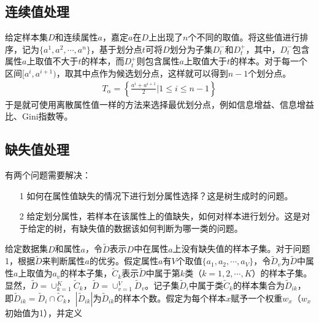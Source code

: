 \subsection{连续值处理}
给定样本集$D$和连续属性$a$，嘉定$a$在$D$上出现了$n$个不同的取值。将这些值进行排序，记为$\{ a^1,a^2,\cdots,a^n \}$，基于划分点$t$可将$D$划分为子集$D_t^-$和$D_t^+$，其中，$D_t^-$包含属性$a$上取值不大于$t$的样本，而$D_t^+$则包含属性$a$上取值大于$t$的样本。对于每一个区间$[ a^i,a^{i+1} )$，取其中点作为候选划分点，这样就可以得到$n-1$个划分点。
\begin{eqnarray}
T_\alpha=
\left\lbrace
\frac{a^i+a^{i+1}}{2}|1\leq i\leq n-1
\right\rbrace
\end{eqnarray}
于是就可使用离散属性值一样的方法来选择最优划分点，例如信息增益、信息增益比、Gini指数等。

\subsection{缺失值处理}
有两个问题需要解决：
\begin{itemize}
\item[1] 如何在属性值缺失的情况下进行划分属性选择？这是树生成时的问题。
\item[2] 给定划分属性，若样本在该属性上的值缺失，如何对样本进行划分。这是对于给定的树，有缺失值的数据该如何判断为哪一类的问题。
\end{itemize}
给定数据集$D$和属性$a$，令$\tilde{D}$表示$D$中在属性$a$上没有缺失值的样本子集。对于问题1，根据$\tilde{D}$来判断属性$a$的优劣。假定属性$a$有$V$个取值$\{ a_1,a_2,\cdots,a_V \}$，令$\tilde{D}_v$为$\tilde{D}$中属性$a$上取值为$a_v$的样本子集，$\tilde{C}_k$表示$\tilde{D}$中属于第$k$类（$k=1,2,\cdots,K$）的样本子集。显然，$\tilde{D}=\cup^{K}_{k=1}\tilde{C}_k$，$\tilde{D}=\cup^{V}_{v=1}\tilde{D}_v$。记子集$\tilde{D}_i$中属于类$\tilde{C}_k$的样本集合为$\tilde{D}_{ik}$，即$\tilde{D}_{ik}=\tilde{D}_i\cap \tilde{C}_k$，$|\tilde{D}_{ik}|$为$\tilde{D}_{ik}$的样本个数。假定为每个样本$x$赋予一个权重$w_x$（$w_x$初始值为1），并定义

